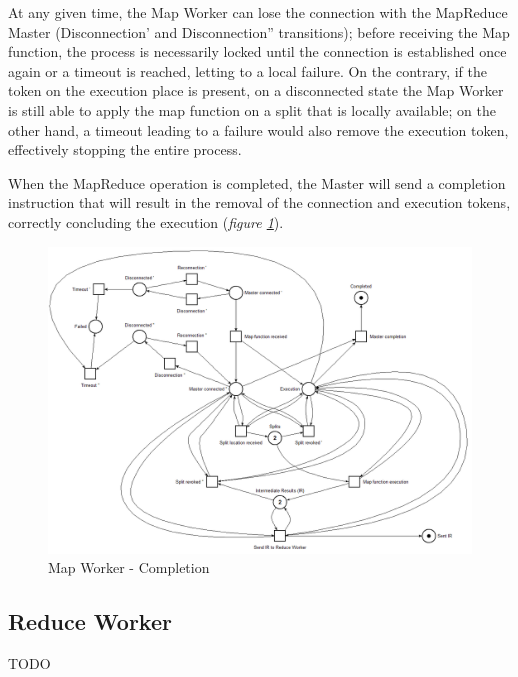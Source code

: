 \vspace{2mm}

At any given time, the Map Worker can lose the connection with the MapReduce Master (Disconnection' and Disconnection'' transitions); before receiving the Map function, the process is necessarily locked until the connection is established once again or a timeout is reached, letting to a local failure. On the contrary, if the token on the execution place is present, on a disconnected state the Map Worker is still able to apply the map function on a split that is locally available; on the other hand, a timeout leading to a failure would also remove the execution token, effectively stopping the entire process.
\vspace{8mm}

When the MapReduce operation is completed, the Master will send a completion instruction that will result in the removal of the connection and execution tokens, correctly concluding the execution (\textit{figure \ref{fig:map_worker_petri_net_4}}).

\begin{figure}[!ht]
    \centering
    \includegraphics[width=\linewidth]{document/chapters/chapter_6/images/map_worker_petri_net_4.png}
    \caption{Map Worker - Completion}
    \label{fig:map_worker_petri_net_4}
\end{figure}

\subsection{Reduce Worker}
TODO

